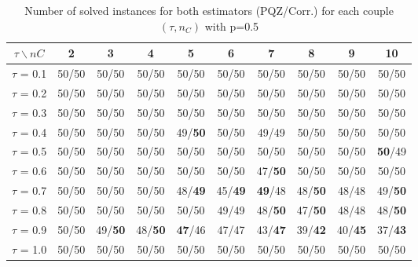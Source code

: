 \begin{table}[H]
\centering


\begin{tabular}{|c|c|c|c|c|c|c|c|c|c|}
\hline
$\tau \backslash nC$ & 2 & 3 & 4 & 5 & 6 & 7 & 8 & 9 & 10 \\
\hline
$\tau$ = 0.1 & 50/50 & 50/50 & 50/50 & 50/50 & 50/50 & 50/50 & 50/50 & 50/50 & 50/50 \\
\hline
$\tau$ = 0.2 & 50/50 & 50/50 & 50/50 & 50/50 & 50/50 & 50/50 & 50/50 & 50/50 & 50/50 \\
\hline
$\tau$ = 0.3 & 50/50 & 50/50 & 50/50 & 50/50 & 50/50 & 50/50 & 50/50 & 50/50 & 50/50 \\
\hline
$\tau$ = 0.4 & 50/50 & 50/50 & 50/50 & 49/\textbf{50} & 50/50 & 49/49 & 50/50 & 50/50 & 50/50 \\
\hline
$\tau$ = 0.5 & 50/50 & 50/50 & 50/50 & 50/50 & 50/50 & 50/50 & 50/50 & 50/50 & \textbf{50}/49 \\
\hline
$\tau$ = 0.6 & 50/50 & 50/50 & 50/50 & 50/50 & 50/50 & 47/\textbf{50} & 50/50 & 50/50 & 50/50 \\
\hline
$\tau$ = 0.7 & 50/50 & 50/50 & 50/50 & 48/\textbf{49} & 45/\textbf{49} & \textbf{49}/48 & 48/\textbf{50} & 48/48 & 49/\textbf{50} \\
\hline
$\tau$ = 0.8 & 50/50 & 50/50 & 50/50 & 50/50 & 49/49 & 48/\textbf{50} & 47/\textbf{50} & 48/48 & 48/\textbf{50} \\
\hline
$\tau$ = 0.9 & 50/50 & 49/\textbf{50} & 48/\textbf{50} & \textbf{47}/46 & 47/47 & 43/\textbf{47} & 39/\textbf{42} & 40/\textbf{45} & 37/\textbf{43} \\
\hline
$\tau$ = 1.0 & 50/50 & 50/50 & 50/50 & 50/50 & 50/50 & 50/50 & 50/50 & 50/50 & 50/50 \\
\hline
\end{tabular}
~	\caption{Number of solved instances for both estimators (PQZ/Corr.) for each couple $(\tau, n_C)$ with p=0.5}
    \label{nbSolved05}
\end{table}
